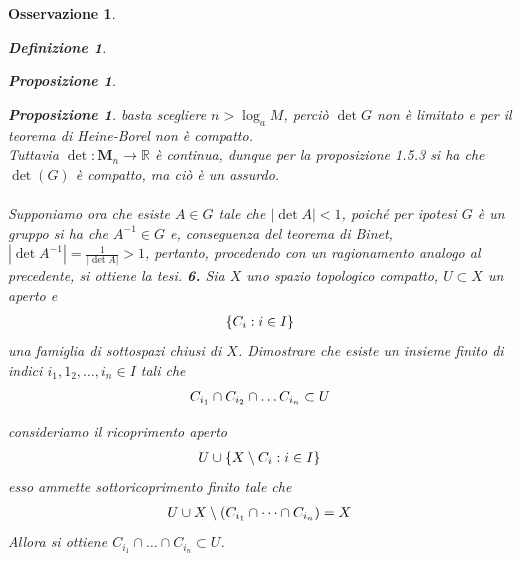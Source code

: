 \documentclass[oneside, 11pt]{amsbook}
\makeatletter
\newcommand{\0}{{(0)}}
\newcommand{\3}{{(3)}}
\theoremstyle{colonplain}
\newtheorem{prop}[thm]{Proposizione}
\theoremstyle{colondefinition}
\newtheorem{defn}[thm]{Definizione}
\theoremstyle{colonremark}
\newtheorem{rmk}[thm]{Osservazione}
\numberwithin{equation}{chapter}
\renewcommand{\proofname}{Dimostrazione}
\renewenvironment{proof}[1][\proofname]{\par
  \pushQED{\end{proof}}%
  \normalfont \topsep6\p@\@plus6\p@\relax
  \trivlist
  \item[\hskip\labelsep\bfseries #1:]\ignorespaces
}{%
  \popQED\endtrivlist\@endpefalse
}
\makeatother
\begin{document}
\begin{rmk}
\begin{defn}
\begin{prop}
\begin{prop}
\begin{proof}[Soluzione]
basta scegliere $n > \log_a M$, perciò $\det G$ non è limitato e per il teorema di Heine-Borel non è compatto. \\
Tuttavia $\det : \mathbf{M}_n \longrightarrow \mathbb{R}$ è continua, dunque per la \textit{proposizione 1.5.3} si ha che $\det(G)$ è compatto, ma ciò è un assurdo. \\ \\
Supponiamo ora che esiste $A \in G$ tale che $|\det A| < 1$, poiché per ipotesi $G$ è un gruppo si ha che $A^{-1} \in G$ e, conseguenza del teorema di Binet, $|\det A^{-1}| = \frac{1}{|\det A|} > 1$, pertanto, procedendo con un ragionamento analogo al precedente, si ottiene la tesi.
\end{proof}
\textbf{6.} Sia $X$ uno spazio topologico compatto, $U \subset X$ un aperto e
\begin{align}
    \{ C_i : i \in I \} \notag
\end{align}
una famiglia di sottospazi chiusi di $X$. Dimostrare che esiste un insieme finito di indici $i_1, 1_2, \dots, i_n \in I$ tali che
\begin{align}
    C_{i_1} \cap C_{i_2} \cap \dots C_{i_n} \subset U \notag
\end{align}
\begin{proof}[Soluzione]
consideriamo il ricoprimento aperto
\begin{align}
    U \cup \{ X \setminus C_i : i \in I \} \notag
\end{align}
esso ammette sottoricoprimento finito tale che
\begin{align}
    U \cup X \setminus (C_{i_1} \cap \dots \cap C_{i_n}) = X \notag
\end{align}
Allora si ottiene $C_{i_1} \cap \dots \cap C_{i_n} \subset U$.
\end{proof}


\end{prop}
\end{prop}
\end{defn}
\end{rmk}
\end{document}
